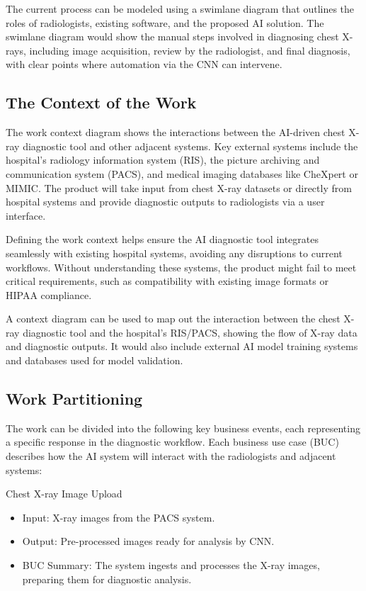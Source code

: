 \documentclass[12pt]{article}
\begin{document}
The current process can be modeled using a swimlane diagram that outlines the roles of 
radiologists, existing software, and the proposed AI solution. The swimlane diagram would show the 
manual steps involved in diagnosing chest X-rays, including image acquisition, review by the 
radiologist, and final diagnosis, with clear points where automation via the CNN can intervene.


\subsection{The Context of the Work}
The work context diagram shows the interactions between the AI-driven chest X-ray diagnostic tool 
and other adjacent systems. Key external systems include the hospital's radiology information 
system (RIS), the picture archiving and communication system (PACS), and medical imaging databases 
like CheXpert or MIMIC. The product will take input from chest X-ray datasets or directly from 
hospital systems and provide diagnostic outputs to radiologists via a user interface.

Defining the work context helps ensure the AI diagnostic tool integrates seamlessly with existing 
hospital systems, avoiding any disruptions to current workflows. Without understanding these 
systems, the product might fail to meet critical requirements, such as compatibility with existing 
image formats or HIPAA compliance.

A context diagram can be used to map out the interaction between the chest X-ray diagnostic tool 
and the hospital’s RIS/PACS, showing the flow of X-ray data and diagnostic outputs. It would also 
include external AI model training systems and databases used for model validation.


\subsection{Work Partitioning}
The work can be divided into the following key business events, each representing a specific 
response in the diagnostic workflow. Each business use case (BUC) describes how the AI system will 
interact with the radiologists and adjacent systems:

Chest X-ray Image Upload
\begin{itemize}
    \item Input: X-ray images from the PACS system.
    \item Output: Pre-processed images ready for analysis by CNN.
    \item BUC Summary: The system ingests and processes the X-ray images, preparing them for 
        diagnostic analysis.
\end{itemize}
\end{document}
